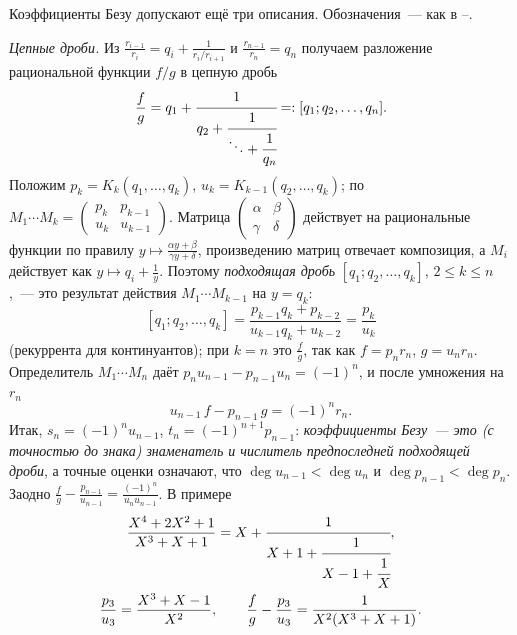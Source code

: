 \begin{aside}
Коэффициенты Безу допускают ещё три описания. Обозначения~--- как в --.

\emph{Цепные дроби.} Из $\frac{r_{i-1}}{r_i}=q_i+\frac1{r_i/r_{i+1}}$ и $\frac{r_{n-1}}{r_n}=q_n$ получаем разложение
рациональной функции $f/g$ в цепную дробь
\[
\frac fg=q_1+\cfrac1{q_2+\cfrac1{\ddots+\cfrac1{q_n}}}=:[q_1;q_2,\dots,q_n].
\]
Положим $p_k=K_k(q_1,\dots,q_k)$, $u_k=K_{k-1}(q_2,\dots,q_k)$; по 
$M_1\cdots M_k=\left(\begin{smallmatrix}p_k&p_{k-1}\\u_k&u_{k-1}\end{smallmatrix}\right)$. Матрица
$\left(\begin{smallmatrix}\alpha&\beta\\\gamma&\delta\end{smallmatrix}\right)$ действует на рациональные функции по
правилу $y\mapsto\frac{\alpha y+\beta}{\gamma y+\delta}$, произведению матриц отвечает композиция, а $M_i$ действует как
$y\mapsto q_i+\frac1y$. Поэтому \emph{подходящая дробь} $[q_1;q_2,\dots,q_k]$, $2\le k\le n$,~--- это результат действия
$M_1\cdots M_{k-1}$ на $y=q_k$:
\[
[q_1;q_2,\dots,q_k]=\frac{p_{k-1}q_k+p_{k-2}}{u_{k-1}q_k+u_{k-2}}=\frac{p_k}{u_k}
\]
(рекуррента для континуантов); при $k=n$ это $\frac fg$, так как $f=p_nr_n$, $g=u_nr_n$. Определитель $M_1\cdots M_n$
даёт $p_nu_{n-1}-p_{n-1}u_n=(-1)^n$, и после умножения на $r_n$
\[
u_{n-1}\,f-p_{n-1}\,g=(-1)^nr_n .
\]
Итак, $s_n=(-1)^nu_{n-1}$, $t_n=(-1)^{n+1}p_{n-1}$: \emph{коэффициенты Безу~--- это (с точностью до знака) знаменатель и
числитель предпоследней подходящей дроби}, а точные оценки  означают, что $\deg u_{n-1}<\deg u_n$ и
$\deg p_{n-1}<\deg p_n$. Заодно $\frac fg-\frac{p_{n-1}}{u_{n-1}}=\frac{(-1)^n}{u_nu_{n-1}}$. В примере 
\begin{gather*}
\frac{X^4+2X^2+1}{X^3+X+1}=X+\cfrac1{X+1+\cfrac1{X-1+\cfrac1X}},\\
\frac{p_3}{u_3}=\frac{X^3+X-1}{X^2},\qquad \frac fg-\frac{p_3}{u_3}=\frac1{X^2(X^3+X+1)}.
\end{gather*}


\end{aside}

